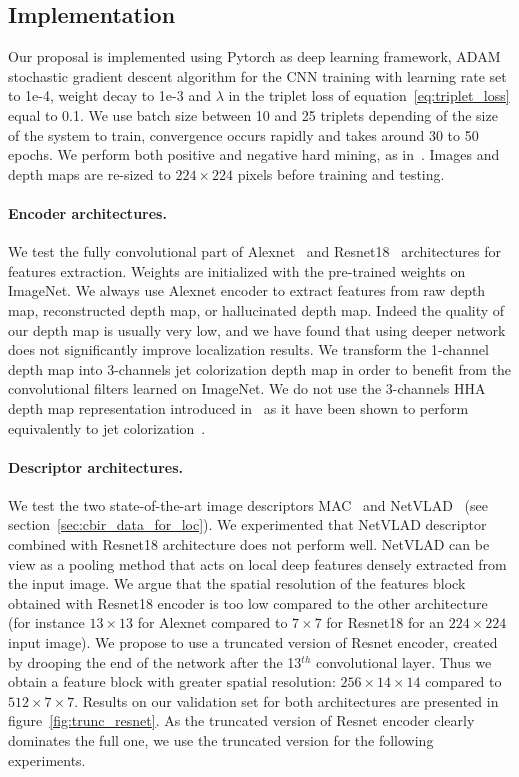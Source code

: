 \subsection{Implementation}
\label{subsec:implementation}

Our proposal is implemented using Pytorch as deep learning framework, ADAM stochastic gradient descent algorithm for the CNN training with learning rate set to 1e-4, weight decay to 1e-3 and $\lambda$ in the triplet loss of equation~\ref{eq:triplet_loss} equal to 0.1. We use batch size between 10 and 25 triplets depending of the size of the system to train, convergence occurs rapidly and takes around 30 to 50 epochs. We perform both positive and negative hard mining, as in~\cite{Radenovic2017}. Images and depth maps are re-sized to $224\times224$ pixels before training and testing.

\paragraph{Encoder architectures.}
We test the fully convolutional part of Alexnet~\citep{Krizhevsky2012} and Resnet18~\citep{he2016deep} architectures for features extraction. Weights are initialized with the pre-trained weights on ImageNet. We always use Alexnet encoder to extract features from raw depth map, reconstructed depth map, or hallucinated depth map. Indeed the quality of our depth map is usually very low, and we have found that using deeper network does not significantly improve localization results. We transform the 1-channel depth map into 3-channels jet colorization depth map in order to benefit from the convolutional filters learned on ImageNet. We do not use the 3-channels HHA depth map representation introduced in~\cite{Gupta2014} as it have been shown to perform equivalently to jet colorization~\cite{Eitel2015}.

\paragraph{Descriptor architectures.}

We test the two state-of-the-art image descriptors MAC~\citep{Razavian2014a} and NetVLAD~\citep{Arandjelovic2017} (see section~\ref{sec:cbir_data_for_loc}). We experimented that NetVLAD descriptor combined with Resnet18 architecture does not perform well. NetVLAD can be view as a pooling method that acts on local deep features densely extracted from the input image. We argue that the spatial resolution of the features block obtained with Resnet18 encoder is too low compared to the other architecture (for instance $13\times13$ for Alexnet compared to $7\times7$ for Resnet18 for an $224\times224$ input image). We propose to use a truncated version of Resnet encoder, created by drooping the end of the network after the 13$^{th}$ convolutional layer. Thus we obtain a feature block with greater spatial resolution: $256\times14\times14$ compared to $512\times7\times7$. Results on our validation set for both architectures are presented in figure~\ref{fig:trunc_resnet}. As the truncated version of Resnet encoder clearly dominates the full one, we use the truncated version for the following experiments.

